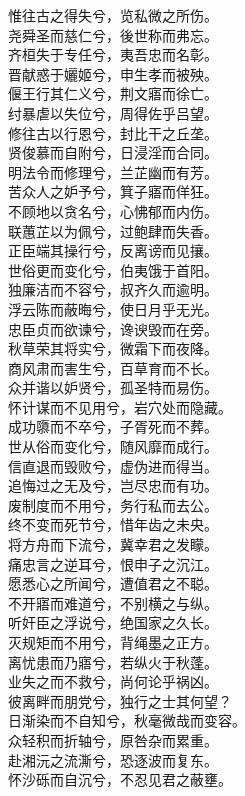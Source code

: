 \documentclass[]{article}
\begin{document}
惟往古之得失兮，览私微之所伤。\\
尧舜圣而慈仁兮，後世称而弗忘。\\
齐桓失于专任兮，夷吾忠而名彰。\\
晋献惑于孋姬兮，申生孝而被殃。\\
偃王行其仁义兮，荆文寤而徐亡。\\
纣暴虐以失位兮，周得佐乎吕望。\\
修往古以行恩兮，封比干之丘垄。\\
贤俊慕而自附兮，日浸淫而合同。\\
明法令而修理兮，兰芷幽而有芳。\\
苦众人之妒予兮，箕子寤而佯狂。\\
不顾地以贪名兮，心怫郁而内伤。\\
联蕙芷以为佩兮，过鲍肆而失香。\\
正臣端其操行兮，反离谤而见攘。\\
世俗更而变化兮，伯夷饿于首阳。\\
独廉洁而不容兮，叔齐久而逾明。\\
浮云陈而蔽晦兮，使日月乎无光。\\
忠臣贞而欲谏兮，谗谀毁而在旁。\\
秋草荣其将实兮，微霜下而夜降。\\
商风肃而害生兮，百草育而不长。\\
众并谐以妒贤兮，孤圣特而易伤。\\
怀计谋而不见用兮，岩穴处而隐藏。\\
成功隳而不卒兮，子胥死而不葬。\\
世从俗而变化兮，随风靡而成行。\\
信直退而毁败兮，虚伪进而得当。\\
追悔过之无及兮，岂尽忠而有功。\\
废制度而不用兮，务行私而去公。\\
终不变而死节兮，惜年齿之未央。\\
将方舟而下流兮，冀幸君之发矇。\\
痛忠言之逆耳兮，恨申子之沉江。\\
愿悉心之所闻兮，遭值君之不聪。\\
不开寤而难道兮，不别横之与纵。\\
听奸臣之浮说兮，绝国家之久长。\\
灭规矩而不用兮，背绳墨之正方。\\
离忧患而乃寤兮，若纵火于秋蓬。\\
业失之而不救兮，尚何论乎祸凶。\\
彼离畔而朋党兮，独行之士其何望？\\
日渐染而不自知兮，秋毫微哉而变容。\\
众轻积而折轴兮，原咎杂而累重。\\
赴湘沅之流澌兮，恐逐波而复东。\\
怀沙砾而自沉兮，不忍见君之蔽壅。
\end{document}
